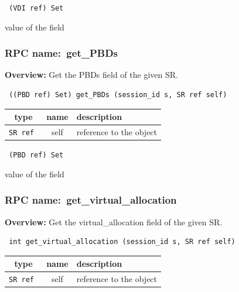 \vspace{0.3cm}

{\tt 
(VDI ref) Set
}


value of the field
\vspace{0.3cm}
\vspace{0.3cm}
\vspace{0.3cm}
\subsubsection{RPC name:~get\_PBDs}

{\bf Overview:} 
Get the PBDs field of the given SR.

\begin{verbatim} ((PBD ref) Set) get_PBDs (session_id s, SR ref self)\end{verbatim}



 
\vspace{0.3cm}
\begin{tabular}{|c|c|p{7cm}|}
 \hline
{\bf type} & {\bf name} & {\bf description} \\ \hline
{\tt SR ref } & self & reference to the object \\ \hline 

\end{tabular}

\vspace{0.3cm}

{\tt 
(PBD ref) Set
}


value of the field
\vspace{0.3cm}
\vspace{0.3cm}
\vspace{0.3cm}
\subsubsection{RPC name:~get\_virtual\_allocation}

{\bf Overview:} 
Get the virtual\_allocation field of the given SR.

\begin{verbatim} int get_virtual_allocation (session_id s, SR ref self)\end{verbatim}



 
\vspace{0.3cm}
\begin{tabular}{|c|c|p{7cm}|}
 \hline
{\bf type} & {\bf name} & {\bf description} \\ \hline
{\tt SR ref } & self & reference to the object \\ \hline 

\end{tabular}

